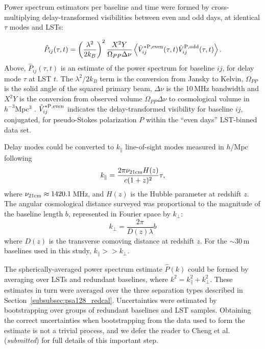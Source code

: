 Power spectrum estimators per baseline and time were formed by cross-multiplying delay-transformed visibilities between even and odd days, at identical $\tau$ modes and LSTs:

\begin{equation}
\hat{P}_{ij}(\tau, t) = \left(\frac{\lambda^2}{2k_B}\right)^2 \frac{X^2Y}{\Omega_{PP}\Delta\nu} \left\langle \tilde{V}^{\rm* P, even}_{ij}(\tau,t) \tilde{V}^{\rm P, odd}_{ij}(\tau,t) \right\rangle.
\end{equation}
Above, $\hat{P}_{ij}(\tau, t)$ is an estimate of the power spectrum for baseline $ij$, for delay mode $\tau$ at LST $t$. The $\lambda^2/2k_B$ term is the conversion from Jansky to Kelvin, $\Omega_{PP}$ is the solid angle of the squared primary beam, $\Delta\nu$ is the 10\,MHz bandwidth and $X^2Y$ is the conversion from observed volume $\Omega_{PP}\Delta\nu$ to cosmological volume in $h^{-3}$Mpc$^3$ \citep{Parsons.12b}. $\tilde{V}^{\rm* P, even}_{ij}$ indicates the delay-transformed visibility for baseline $ij$, conjugated, for pseudo-Stokes polarization $P$ within the ``even days'' LST-binned data set.

Delay modes could be converted to $k_{\parallel}$ line-of-sight modes measured in $h$/Mpc following
\begin{equation}
k_{\parallel} = \frac{2\pi \nu_{\rm 21cm} H(z)}{c(1+z)^2}\tau,
\end{equation}
where $\nu_{\rm 21cm}\approx1420.1$\,MHz, and $H(z)$ is the Hubble parameter at redshift $z$. The angular cosmological distance surveyed was proportional to the magnitude of the baseline length $b$, represented in Fourier space by $k_{\perp}$:
\begin{equation}
k_{\perp} = \frac{2\pi}{D(z)\lambda}b
\end{equation}
where $D(z)$ is the transverse comoving distance at redshift $z$. For the $\sim$30\,m baselines used in this study, $k_{\parallel}>>k_{\perp}$. 

The spherically-averaged power spectrum estimate $\hat{P}(k)$ could be formed by averaging over LSTs and redundant baselines, where $k^2 = k_{\parallel}^2 + k_{\perp}^2$. These estimates in turn were averaged over the three separation types described in Section~\ref{subsubsec:psa128_redcal}. Uncertainties were estimated by bootstrapping over groups of redundant baselines and LST samples. Obtaining the correct uncertainties when bootstrapping from the data used to form the estimate is not a trivial process, and we defer the reader to Cheng et al. (\textit{submitted}) for full details of this important step. 

